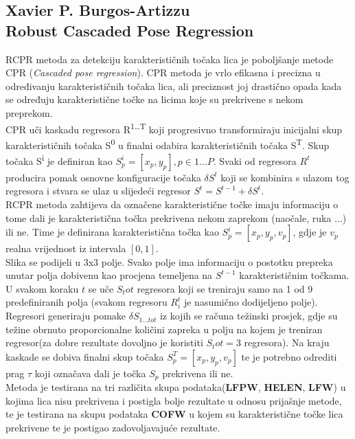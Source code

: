 \subsection{Xavier P. Burgos-Artizzu\\Robust Cascaded Pose Regression}
RCPR metoda za detekciju karakterističnih točaka lica je poboljšanje metode CPR (\textit{Cascaded pose regression}). CPR metoda je vrlo efikasna i precizna u određivanju karakterističnih točaka lica, ali preciznost joj drastično opada kada se određuju karakteristične točke na licima koje su prekrivene s nekom preprekom. 
\\CPR uči kaskadu regresora R\textsuperscript{1\ldots T} koji progresivno transformiraju inicijalni skup karakterističnih točaka S\textsuperscript{0} u finalni odabira karakterističnih točaka S\textsuperscript{T}. Skup točaka S\textsuperscript{i} je definiran kao $ S_p^i = [x_p, y_p], p \in 1\ldots P$. Svaki od regresora $R^t$ producira pomak osnovne konfiguracije točaka $ \delta S^t$ koji se kombinira s ulazom tog regresora i stvara se ulaz u slijedeći regresor $S^t = S^{t-1} + \delta S^t$. \\
RCPR metoda zahtijeva da označene karakteristične točke imaju informaciju o tome dali je karakteristična točka prekrivena nekom zaprekom (naočale, ruka ...) ili ne. Time je definirana karakteristična točka kao $S_p^i = [x_p, y_p, v_p]$, gdje je $v_p$ realna vrijednost iz intervala $[0, 1]$.\\
Slika se podijeli u 3x3 polje. Svako polje ima informaciju o postotku prepreka unutar polja dobivenu kao procjena temeljena na $S^{t-1}$ karakterističnim točkama. U svakom koraku $t$ se uče $S_tot$ regresora koji se treniraju samo na 1 od 9 predefiniranih polja (svakom regresoru $R_i^t$ je nasumično dodijeljeno polje). Regresori generiraju pomake $\delta S_{1\ldots tot}$ iz kojih se računa težinski prosjek, gdje su težine obrnuto proporcionalne količini zapreka u polju na kojem je treniran regresor(za dobre rezultate dovoljno je koristiti $S_tot = 3$ regresora). Na kraju kaskade se dobiva finalni skup točaka $S_p^T = [x_p, y_p, v_p]$ te je potrebno odrediti prag $\tau$ koji označava dali je točka $S_p$ prekrivena ili ne. \\
Metoda je testirana na tri različita skupa podataka(\textbf{LFPW}, \textbf{HELEN}, \textbf{LFW}) u kojima lica nisu prekrivena i postigla bolje rezultate u odnosu prijašnje metode, te je testirana na skupu podataka \textbf{COFW} u kojem su karakteristične točke lica prekrivene te je postigao zadovoljavajuće  rezultate.